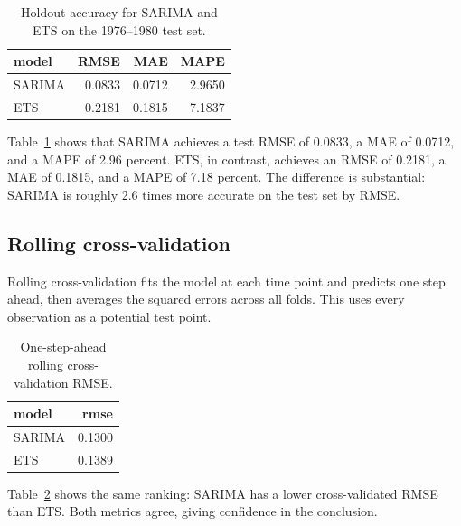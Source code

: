 \documentclass[
  english,
  a4paper,
]{article}
\begin{document}
{

\begin{longtable}[]{@{}lrrr@{}}

\caption{\label{tbl-holdout}Holdout accuracy for SARIMA and ETS on the
1976--1980 test set.}

\tabularnewline

\toprule\noalign{}
model & RMSE & MAE & MAPE \\
\midrule\noalign{}
\endhead
\bottomrule\noalign{}
\endlastfoot
SARIMA & 0.0833 & 0.0712 & 2.9650 \\
ETS & 0.2181 & 0.1815 & 7.1837 \\

\end{longtable}

}

Table~\ref{tbl-holdout} shows that SARIMA achieves a test RMSE of
0.0833, a MAE of 0.0712, and a MAPE of 2.96 percent. ETS, in contrast,
achieves an RMSE of 0.2181, a MAE of 0.1815, and a MAPE of 7.18 percent.
The difference is substantial: SARIMA is roughly 2.6 times more accurate
on the test set by RMSE.

\subsection{Rolling cross-validation}\label{rolling-cross-validation}

Rolling cross-validation fits the model at each time point and predicts
one step ahead, then averages the squared errors across all folds. This
uses every observation as a potential test point.

{

\begin{longtable}[]{@{}lr@{}}

\caption{\label{tbl-tscv}One-step-ahead rolling cross-validation RMSE.}

\tabularnewline

\toprule\noalign{}
model & rmse \\
\midrule\noalign{}
\endhead
\bottomrule\noalign{}
\endlastfoot
SARIMA & 0.1300 \\
ETS & 0.1389 \\

\end{longtable}

}

Table~\ref{tbl-tscv} shows the same ranking: SARIMA has a lower
cross-validated RMSE than ETS. Both metrics agree, giving confidence in
the conclusion.
\end{document}
